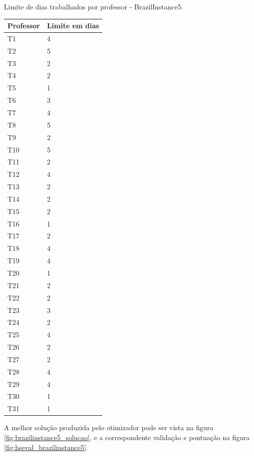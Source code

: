\begin{quadro}[h]
	\centering
	\caption{Limite de dias trabalhados por professor - BrazilInstance5.\label{qua:limites_dias_trabalhados_brazilinstance5}}
	\begin{tabular}{|p{2cm}|p{4cm}|}
		\hline
		\textbf{Professor} & \textbf{Limite em dias} \\
		\hline
		T1 & 4 \\
		\hline
		T2 & 5 \\
		\hline
		T3 & 2 \\
		\hline
		T4 & 2 \\
		\hline
		T5 & 1 \\
		\hline
		T6 & 3 \\
		\hline
		T7 & 4 \\
		\hline
		T8 & 5 \\
		\hline
		T9 & 2 \\
		\hline
		T10 & 5 \\
		\hline
		T11 & 2 \\
		\hline
		T12 & 4 \\
		\hline
		T13 & 2 \\
		\hline
		T14 & 2 \\
		\hline
		T15 & 2 \\
		\hline
		T16 & 1 \\
		\hline
		T17 & 2 \\
		\hline
		T18 & 4 \\
		\hline
		T19 & 4 \\
		\hline
		T20 & 1 \\
		\hline
		T21 & 2 \\
		\hline
		T22 & 2 \\
		\hline
		T23 & 3 \\
		\hline
		T24 & 2 \\
		\hline
		T25 & 4 \\
		\hline
		T26 & 2 \\
		\hline
		T27 & 2 \\
		\hline
		T28 & 4 \\
		\hline
		T29 & 4 \\
		\hline
		T30 & 1 \\
		\hline
		T31 & 1 \\
		\hline
	\end{tabular}
\end{quadro}

A melhor solução produzida pelo otimizador pode ser vista na figura \ref{fig:brazilinstance5_solucao}, e a correspondente validação e pontuação na figura \ref{fig:hseval_brazilinstance5}.

